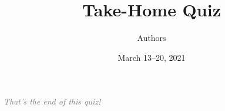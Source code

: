 \documentclass[12pt]{article}
\title{Take-Home Quiz}      			 %
\author{Authors}
\date{March 13--20, 2021}             %
\begin{document}











\vfill
\begin{center}
\textcolor{gray}{\textit{That's the end of this quiz!}}
\end{center}
\newpage
\end{document}
